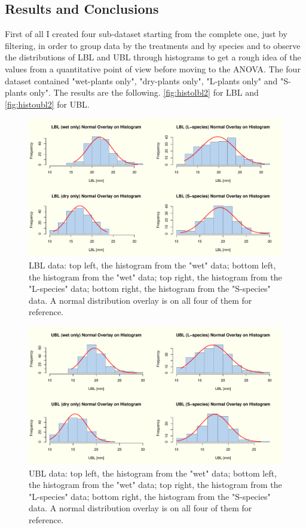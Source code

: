 \documentclass{article}
\begin{document}
\subsection{Results and Conclusions}
First of all I created four sub-dataset starting from the complete one, just by filtering, in order to group data by the treatments and by species and to observe the distributions of LBL and UBL through histograms to get a rough idea of the values from a quantitative point of view before moving to the ANOVA. The four dataset contained "wet-plants only", "dry-plants only", "L-plants only" and "S-plants only". The results are the following. \autoref{fig:histolbl2} for LBL and \autoref{fig:histoubl2} for UBL.
\iffalse
\begin{figure}[H]
\centering
  \includegraphics[scale=0.5]{histograms_lbl.pdf}
\caption{LBL data: top left, the histogram from the "wet" data; bottom left, the histogram from the "wet" data; top right, the histogram from the "L-species" data; bottom right, the histogram from the "S-species" data. A normal distribution overlay is on all four of them for reference.}
  \label{fig:histolbl}
\end{figure}
\begin{figure}[H]
\centering
  \includegraphics[scale=0.5]{histograms_ubl.pdf}
\caption{UBL data: top left, the histogram from the "wet" data; bottom left, the histogram from the "wet" data; top right, the histogram from the "L-species" data; bottom right, the histogram from the "S-species" data. A normal distribution overlay is on all four of them for reference.}
  \label{fig:histoubl}
\end{figure}
\end{document}
